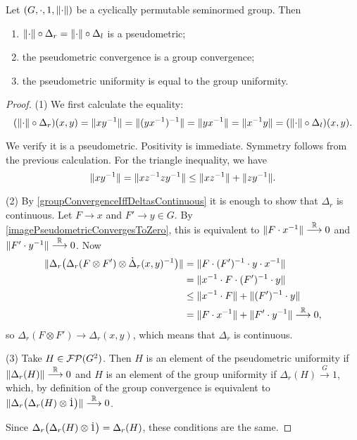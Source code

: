 \begin{proposition} \label{groupSeminormConvergence}
Let $\left( G, \cdot, 1, \lVert\cdot\rVert \right)$ be a cyclically permutable seminormed group. Then 
\begin{enumerate}
\item $\lVert\cdot\rVert\circ \Delta_r = \lVert\cdot\rVert\circ \Delta_l$ is a pseudometric;
\item the pseudometric convergence is a group convergence;
\item the pseudometric uniformity is equal to the group uniformity.
\end{enumerate} 
\end{proposition}
\begin{proof}
(1) We first calculate the equality:
\[ (\lVert\cdot\rVert\circ \Delta_r)(x,y) = \lVert xy^{-1}\rVert = \lVert(yx^{-1})^{-1}\rVert = \lVert yx^{-1}\rVert = \lVert x^{-1}y\rVert = (\lVert\cdot\rVert\circ \Delta_l)(x,y). \]

We verify it is a pseudometric. Positivity is immediate. Symmetry follows from the previous calculation. For the triangle inequality, we have
\[ \lVert xy^{-1}\rVert = \lVert xz^{-1}zy^{-1}\rVert \leq \lVert xz^{-1}\rVert + \lVert zy^{-1}\rVert. \]

(2) By \ref{groupConvergenceIffDeltasContinuous} it is enough to show that $\Delta_r$ is continuous. Let $F\to x$ and $F'\to y\in G$. By \ref{imagePseudometricConvergesToZero}, this is equivalent to $\lVert F\cdot x^{-1}\rVert \overset{\mathbb{R}}{\longrightarrow} 0$ and $\lVert F'\cdot y^{-1}\rVert \overset{\mathbb{R}}{\longrightarrow} 0$. Now
\begin{align*}
\lVert\Delta_r\big(\Delta_r(F\otimes F')\otimes \dot\Delta_r(x,y)^{-1}\big)\rVert &= \lVert F\cdot (F')^{-1}\cdot y\cdot x^{-1}\rVert \\
&= \lVert x^{-1}\cdot F\cdot (F')^{-1}\cdot y\rVert \\
&\leq \lVert x^{-1}\cdot F\rVert+ \lVert(F')^{-1}\cdot y\rVert \\
&= \lVert F\cdot x^{-1}\rVert + \lVert F'\cdot y^{-1}\rVert \overset{\mathbb{R}}{\longrightarrow} 0,
\end{align*}
so $\Delta_r(F\otimes F')\to \Delta_r(x,y)$, which means that $\Delta_r$ is continuous.

(3) Take $H\in\operatorname{\mathcal{FP}}(G^2)$. Then $H$ is an element of the pseudometric uniformity if $\lVert\Delta_r(H)\rVert\overset{\mathbb{R}}{\longrightarrow} 0$ and $H$ is an element of the group uniformity if $\Delta_r(H)\overset{G}{\longrightarrow} 1$, which, by definition of the group convergence is equivalent to $\lVert\Delta_r\big(\Delta_r(H)\otimes\dot{1}\big)\rVert\overset{\mathbb{R}}{\longrightarrow} 0$.

Since $\Delta_r\big(\Delta_r(H)\otimes\dot{1}\big) = \Delta_r(H)$, these conditions are the same.
\end{proof}